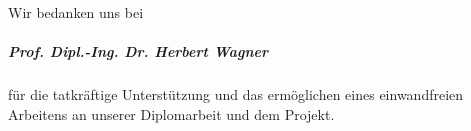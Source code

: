 \newpage
\begin{acknowledgements}
    Wir bedanken uns bei
    \subparagraph{Prof. Dipl.-Ing. Dr. Herbert Wagner} für die tatkräftige Unterstützung und das ermöglichen eines einwandfreien Arbeitens an unserer Diplomarbeit und dem Projekt.
\end{acknowledgements}
